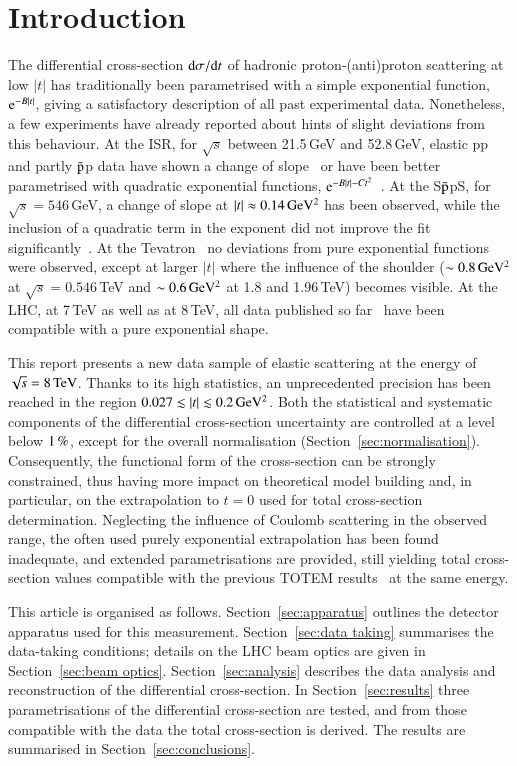 \section{Introduction}
%
The differential cross-section ${\rm d} \sigma/{\rm d} t$ of hadronic proton-(anti)proton 
scattering at low $|t|$ has traditionally been parametrised with a simple 
exponential function, ${\rm e}^{-B |t|}$, giving a satisfactory description of 
all past experimental data.
Nonetheless, a few experiments have already reported about hints of
slight deviations from this behaviour. At the ISR, for $\sqrt{s}$ 
between 21.5\,GeV and 52.8\,GeV, elastic pp and partly $\rm\bar{p}$p data have shown a 
change of slope~\cite{plb39,plb115} or have been better parametrised with quadratic 
exponential functions, ${\rm e}^{-B |t|-C t^2}$~\cite{npb141,npb248}. 
At the S$\rm\bar{p}$pS, for 
$\sqrt{s} = 546\,$GeV, a change of slope at $|t| \approx 0.14\,\rm GeV^{2}$ 
has been observed, while the inclusion of a quadratic term in the exponent did
not improve the fit significantly~\cite{plb147}. At the Tevatron~\cite{prl61,prl68,prd50,prd86} no 
deviations from pure exponential functions were observed, except at larger $|t|$ where
the influence of the shoulder ($\sim 0.8\,\rm GeV^{2}$ at 
$\sqrt{s} = 0.546$\,TeV and $\sim 0.6\,\rm GeV^{2}$ at 1.8 and 1.96\,TeV) 
becomes visible.
At the LHC, at 7\,TeV as well as at 8\,TeV, all data published so 
far~\cite{epl96,epl101-el,prl111,alfa} have been
compatible with a pure exponential shape.

This report presents a new data sample of elastic scattering at the energy of $\sqrt s = 8\,{\rm TeV}$. Thanks to its high statistics,
an unprecedented precision has been reached in the region $0.027 \lesssim |t| \lesssim 0.2\,{\rm GeV^2}$. Both the statistical and systematic components of the differential cross-section uncertainty are controlled 
at a level below $1\,{\rm \%}$, except for the overall normalisation 
(Section~\ref{sec:normalisation}). Consequently, the functional form of the cross-section can be strongly constrained, thus having more impact on theoretical model building and, in particular, on the extrapolation to $t=0$ used for total cross-section determination. Neglecting the influence of Coulomb scattering in the observed range, the often used purely exponential extrapolation has been found inadequate, and extended parametrisations are provided, still yielding total cross-section values compatible with the previous TOTEM results~\cite{prl111} at the same energy.

This article is organised as follows. Section~\ref{sec:apparatus} outlines the detector apparatus used for this measurement. Section~\ref{sec:data taking} summarises the data-taking conditions; details on the LHC beam optics are given in Section~\ref{sec:beam optics}. Section~\ref{sec:analysis} describes the data analysis and reconstruction of the differential cross-section. In Section~\ref{sec:results} three parametrisations of the differential cross-section are tested, and from those compatible with the data the total cross-section is derived. The results are summarised in Section~\ref{sec:conclusions}.
